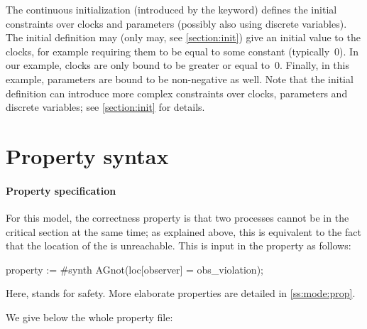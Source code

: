 The continuous initialization (introduced by the  keyword) defines the initial constraints over clocks and parameters (possibly also using discrete variables).
%
The initial definition may (only may, see \cref{section:init}) give an initial value to the clocks, for example requiring them to be equal to some constant (typically~0).
In our example, clocks are only bound to be greater or equal to~0.
%
Finally, in this example, parameters are bound to be non-negative as well.
%
Note that the initial definition can introduce more complex constraints over clocks, parameters and discrete variables; see \cref{section:init} for details.




\section{Property syntax}

\paragraph{Property specification}
For this model, the correctness property is that two processes cannot be in the critical section at the same time; as explained above, this is equivalent to the fact that the  location of the  \IPTA{} is unreachable.
This is input in the property as follows:

\begin{IMITATORproperty}
	property := #synth AGnot(loc[observer] = obs_violation);
\end{IMITATORproperty}

Here,  stands for safety.
More elaborate properties are detailed in \cref{ss:mode:prop}.

We give below the whole property file:




